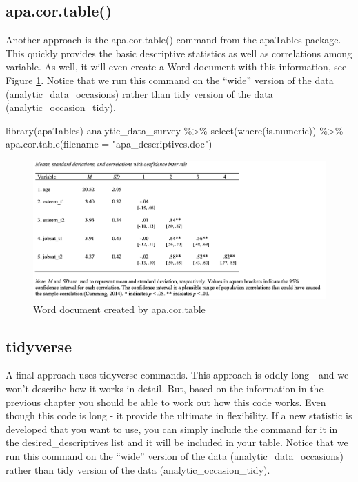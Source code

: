 \documentclass[
]{krantz}
\makeatletter
\newenvironment{Shaded}{\begin{snugshade}}{\end{snugshade}}
\newcommand{\AttributeTok}[1]{\textcolor[rgb]{0.61,0.61,0.61}{#1}}
\newcommand{\FunctionTok}[1]{\textcolor[rgb]{0,0,0}{#1}}
\newcommand{\NormalTok}[1]{#1}
\newcommand{\SpecialCharTok}[1]{\textcolor[rgb]{0,0,0}{#1}}
\newcommand{\StringTok}[1]{\textcolor[rgb]{0.5,0.5,0.5}{#1}}
\newenvironment{kframe}{%
\medskip{}
\setlength{\fboxsep}{.8em}
 \def\at@end@of@kframe{}%
 \ifinner\ifhmode%
  \def\at@end@of@kframe{\end{minipage}}%
  \begin{minipage}{\columnwidth}%
 \fi\fi%
 \def\FrameCommand##1{\hskip\@totalleftmargin \hskip-\fboxsep
 \colorbox{shadecolor}{##1}\hskip-\fboxsep
     \hskip-\linewidth \hskip-\@totalleftmargin \hskip\columnwidth}%
 \MakeFramed {\advance\hsize-\width
   \@totalleftmargin\z@ \linewidth\hsize
   \@setminipage}}%
 {\par\unskip\endMakeFramed%
 \at@end@of@kframe}
\renewenvironment{Shaded}{\begin{kframe}}{\end{kframe}}
\makeatother
\begin{document}
\hypertarget{apa.cor.table}{%
\subsection{apa.cor.table()}\label{apa.cor.table}}

Another approach is the apa.cor.table() command from the apaTables package. This quickly provides the basic descriptive statistics as well as correlations among variable. As well, it will even create a Word document with this information, see Figure \ref{fig:descapa}. Notice that we run this command on the ``wide'' version of the data (analytic\_data\_occasions) rather than tidy version of the data (analytic\_occasion\_tidy).

\begin{Shaded}
\begin{Highlighting}[]
\FunctionTok{library}\NormalTok{(apaTables)}
\NormalTok{analytic\_data\_survey }\SpecialCharTok{\%\textgreater{}\%}
  \FunctionTok{select}\NormalTok{(}\FunctionTok{where}\NormalTok{(is.numeric)) }\SpecialCharTok{\%\textgreater{}\%}
  \FunctionTok{apa.cor.table}\NormalTok{(}\AttributeTok{filename =} \StringTok{"apa\_descriptives.doc"}\NormalTok{)}
\end{Highlighting}
\end{Shaded}

\begin{figure}
\includegraphics[width=1\linewidth]{ch_enter_load/images/desc_apa} \caption{Word document created by apa.cor.table}\label{fig:descapa}
\end{figure}

\hypertarget{tidyverse}{%
\subsection{tidyverse}\label{tidyverse}}

A final approach uses tidyverse commands. This approach is oddly long - and we won't describe how it works in detail. But, based on the information in the previous chapter you should be able to work out how this code works. Even though this code is long - it provide the ultimate in flexibility. If a new statistic is developed that you want to use, you can simply include the command for it in the desired\_descriptives list and it will be included in your table. Notice that we run this command on the ``wide'' version of the data (analytic\_data\_occasions) rather than tidy version of the data (analytic\_occasion\_tidy).
\end{document}

